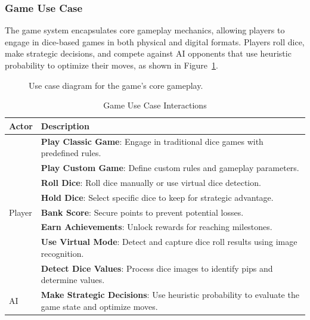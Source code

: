 \subsubsection{Game Use Case}
The game system encapsulates core gameplay mechanics, allowing players to engage in dice-based games in both physical and digital formats. Players roll dice, make strategic decisions, and compete against AI opponents that use heuristic probability to optimize their moves, as shown in Figure~\ref{fig:game_usecase}.

\begin{figure}[ht!]
    \centering
    
    \caption{Use case diagram for the game's core gameplay.}
    \label{fig:game_usecase}
\end{figure}

\begin{table}[ht!]
    \centering
    \caption{Game Use Case Interactions}
    \label{tab:game_usecase}
    \begin{tabular}{|l|p{12cm}|}
        \hline
        \textbf{Actor} & \textbf{Description} \\
        \hline
               & \textbf{Play Classic Game}: Engage in traditional dice games with predefined rules. \\
               & \textbf{Play Custom Game}: Define custom rules and gameplay parameters. \\
               & \textbf{Roll Dice}: Roll dice manually or use virtual dice detection. \\
               & \textbf{Hold Dice}: Select specific dice to keep for strategic advantage. \\
        Player & \textbf{Bank Score}: Secure points to prevent potential losses. \\
               & \textbf{Earn Achievements}: Unlock rewards for reaching milestones. \\
               & \textbf{Use Virtual Mode}: Detect and capture dice roll results using image recognition. \\
               & \textbf{Detect Dice Values}: Process dice images to identify pips and determine values. \\
        \hline
        AI & \textbf{Make Strategic Decisions}: Use heuristic probability to evaluate the game state and optimize moves. \\
        \hline
    \end{tabular}    
\end{table}

